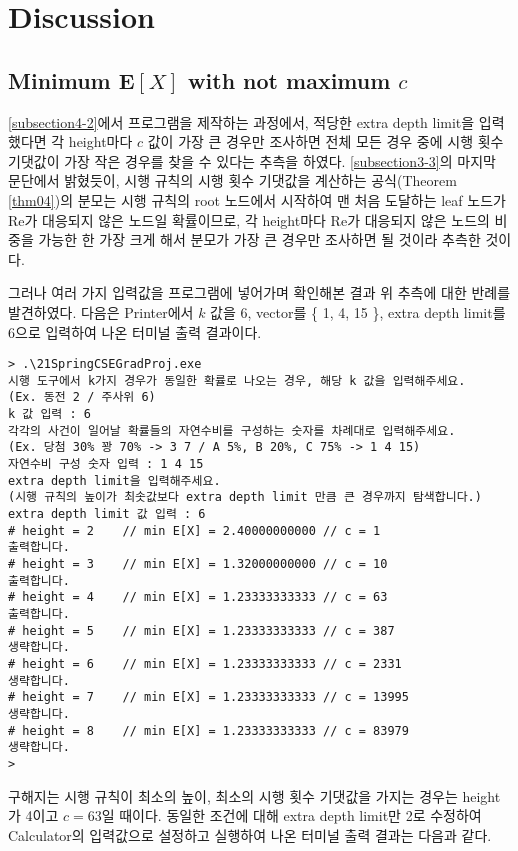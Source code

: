 \documentclass[11pt]{article}
\begin{document}
\section{Discussion}
\subsection{Minimum $\textbf{E}[X]$ with not maximum $c$} \label{subsection5-2}
\ref{subsection4-2}에서 프로그램을 제작하는 과정에서, 적당한 extra depth limit을 입력했다면 각 height마다 $c$ 값이 가장 큰 경우만 조사하면 전체 모든 경우 중에 시행 횟수 기댓값이 가장 작은 경우를 찾을 수 있다는 추측을 하였다. \ref{subsection3-3}의 마지막 문단에서 밝혔듯이, 시행 규칙의 시행 횟수 기댓값을 계산하는 공식(Theorem \ref{thm04})의 분모는 시행 규칙의 root 노드에서 시작하여 맨 처음 도달하는 leaf 노드가 Re가 대응되지 않은 노드일 확률이므로, 각 height마다 Re가 대응되지 않은 노드의 비중을 가능한 한 가장 크게 해서 분모가 가장 큰 경우만 조사하면 될 것이라 추측한 것이다.

그러나 여러 가지 입력값을 프로그램에 넣어가며 확인해본 결과 위 추측에 대한 반례를 발견하였다. 다음은 Printer에서 $k$ 값을 6, vector를 \{ 1, 4, 15 \}, extra depth limit를 6으로 입력하여 나온 터미널 출력 결과이다.
\\

\singlespacing
\begin{verbatim}
> .\21SpringCSEGradProj.exe
시행 도구에서 k가지 경우가 동일한 확률로 나오는 경우, 해당 k 값을 입력해주세요.
(Ex. 동전 2 / 주사위 6)
k 값 입력 : 6
각각의 사건이 일어날 확률들의 자연수비를 구성하는 숫자를 차례대로 입력해주세요.
(Ex. 당첨 30% 꽝 70% -> 3 7 / A 5%, B 20%, C 75% -> 1 4 15)
자연수비 구성 숫자 입력 : 1 4 15
extra depth limit을 입력해주세요.
(시행 규칙의 높이가 최솟값보다 extra depth limit 만큼 큰 경우까지 탐색합니다.)
extra depth limit 값 입력 : 6
# height = 2    // min E[X] = 2.40000000000 // c = 1
출력합니다.
# height = 3    // min E[X] = 1.32000000000 // c = 10
출력합니다.
# height = 4    // min E[X] = 1.23333333333 // c = 63
출력합니다.
# height = 5    // min E[X] = 1.23333333333 // c = 387
생략합니다.
# height = 6    // min E[X] = 1.23333333333 // c = 2331
생략합니다.
# height = 7    // min E[X] = 1.23333333333 // c = 13995
생략합니다.
# height = 8    // min E[X] = 1.23333333333 // c = 83979
생략합니다.
>
\end{verbatim}
\doublespacing

구해지는 시행 규칙이 최소의 높이, 최소의 시행 횟수 기댓값을 가지는 경우는 height가 4이고 $c = 63$일 때이다. 동일한 조건에 대해 extra depth limit만 2로 수정하여 Calculator의 입력값으로 설정하고 실행하여 나온 터미널 출력 결과는 다음과 같다.
\end{document}
